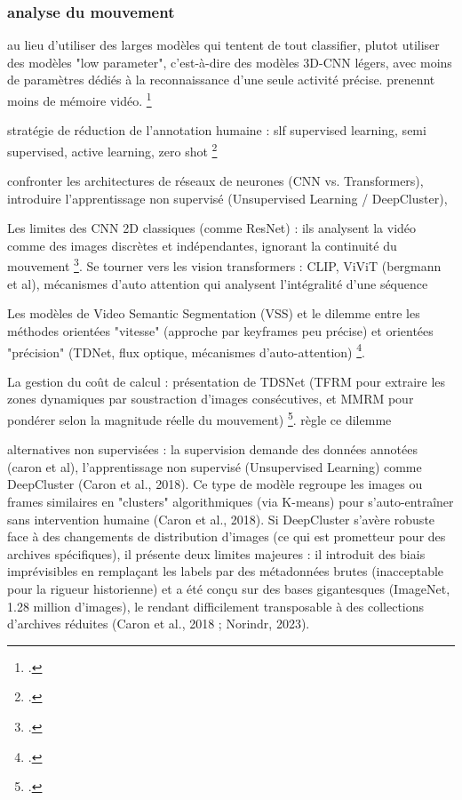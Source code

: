 \subsubsection{analyse du mouvement}

au lieu d'utiliser des larges modèles qui tentent de tout classifier, plutot utiliser des modèles "low parameter", c'est-à-dire des modèles 3D-CNN légers, avec moins de paramètres dédiés à la reconnaissance d'une seule activité précise. prenennt moins de mémoire vidéo. \footcite{pattichis2023}

stratégie de réduction de l'annotation humaine : slf supervised learning, semi supervised, active learning, zero shot \footcite{pattichis2023}

confronter les architectures de réseaux de neurones (CNN vs. Transformers), introduire l'apprentissage non supervisé (Unsupervised Learning / DeepCluster),

Les limites des CNN 2D classiques (comme ResNet) : ils analysent la vidéo comme des images discrètes et indépendantes, ignorant la continuité du mouvement \footcite{xin2023}. Se tourner vers les vision transformers : CLIP, ViViT (bergmann et al), mécanismes d'auto attention qui analysent l'intégralité d'une séquence

Les modèles de Video Semantic Segmentation (VSS) et le dilemme entre les méthodes orientées "vitesse" (approche par keyframes peu précise) et orientées "précision" (TDNet, flux optique, mécanismes d'auto-attention) \footcite{zhou2022}.

La gestion du coût de calcul : présentation de TDSNet (TFRM pour extraire les zones dynamiques par soustraction d'images consécutives, et MMRM pour pondérer selon la magnitude réelle du mouvement) \footcite{yuan2025}. règle ce dilemme 

alternatives non supervisées : la supervision demande des données annotées (caron et al), l'apprentissage non supervisé (Unsupervised Learning) comme DeepCluster (Caron et al., 2018). Ce type de modèle regroupe les images ou frames similaires en "clusters" algorithmiques (via K-means) pour s'auto-entraîner sans intervention humaine (Caron et al., 2018). Si DeepCluster s'avère robuste face à des changements de distribution d'images (ce qui est prometteur pour des archives spécifiques), il présente deux limites majeures : il introduit des biais imprévisibles en remplaçant les labels par des métadonnées brutes (inacceptable pour la rigueur historienne) et a été conçu sur des bases gigantesques (ImageNet, 1.28 million d'images), le rendant difficilement transposable à des collections d'archives réduites (Caron et al., 2018 ; Norindr, 2023).

